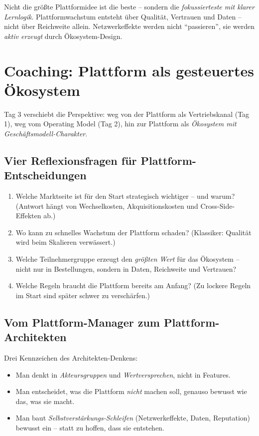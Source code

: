 \documentclass[11pt,a4paper,oneside]{article}
\begin{document}
\begin{merkbox}
Nicht die größte Plattformidee ist die beste -- sondern die \emph{fokussierteste mit klarer Lernlogik}. Plattformwachstum entsteht über Qualität, Vertrauen und Daten -- nicht über Reichweite allein. Netzwerkeffekte werden nicht ``passieren'', sie werden \emph{aktiv erzeugt} durch Ökosystem-Design.
\end{merkbox}

\section{Coaching: Plattform als gesteuertes Ökosystem}

Tag 3 verschiebt die Perspektive: weg von der Plattform als Vertriebskanal (Tag 1), weg vom Operating Model (Tag 2), hin zur Plattform als \emph{Ökosystem mit Geschäftsmodell-Charakter}.

\subsection{Vier Reflexionsfragen für Plattform-Entscheidungen}

\begin{enumerate}
  \item Welche Marktseite ist für den Start strategisch wichtiger -- und warum? (Antwort hängt von Wechselkosten, Akquisitionskosten und Cross-Side-Effekten ab.)
  \item Wo kann zu schnelles Wachstum der Plattform schaden? (Klassiker: Qualität wird beim Skalieren verwässert.)
  \item Welche Teilnehmergruppe erzeugt den \emph{größten Wert} für das Ökosystem -- nicht nur in Bestellungen, sondern in Daten, Reichweite und Vertrauen?
  \item Welche Regeln braucht die Plattform bereits am Anfang? (Zu lockere Regeln im Start sind später schwer zu verschärfen.)
\end{enumerate}

\subsection{Vom Plattform-Manager zum Plattform-Architekten}

Drei Kennzeichen des Architekten-Denkens:

\begin{itemize}
  \item Man denkt in \emph{Akteursgruppen} und \emph{Wertversprechen}, nicht in Features.
  \item Man entscheidet, was die Plattform \emph{nicht} machen soll, genauso bewusst wie das, was sie macht.
  \item Man baut \emph{Selbstverstärkungs-Schleifen} (Netzwerkeffekte, Daten, Reputation) bewusst ein -- statt zu hoffen, dass sie entstehen.
\end{itemize}
\end{document}
